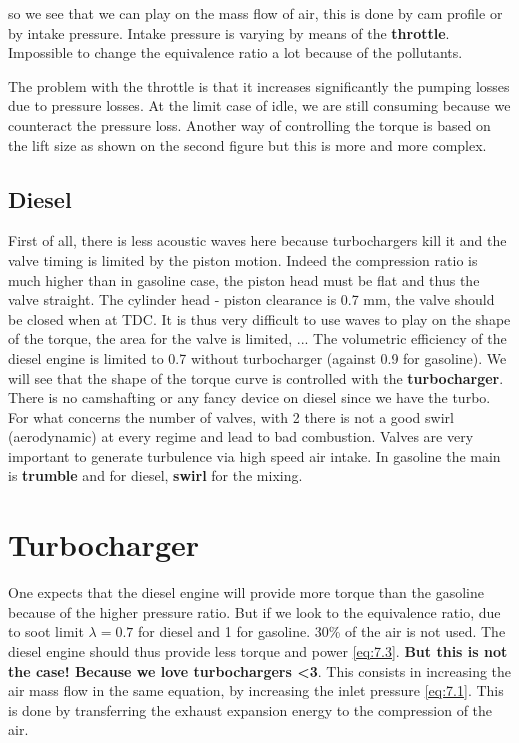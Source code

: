 	so we see that we can play on the mass flow of air, this is done by cam profile or by intake pressure. Intake pressure is varying by means of the \textbf{throttle}. Impossible to change the equivalence ratio a lot because of the pollutants. 
	
	The problem with the throttle is that it increases significantly the pumping losses due to pressure losses. At the limit case of idle, we are still consuming because we counteract the pressure loss. Another way of controlling the torque is based on the lift size as shown on the second figure but this is more and more complex. 
	
\subsection{Diesel}
	First of all, there is less acoustic waves here because turbochargers kill it and the valve timing is limited by the piston motion. Indeed the compression ratio is much higher than in gasoline case, the piston head must be flat and thus the valve straight. The cylinder head - piston clearance is 0.7 mm, the valve should be closed when at TDC. It is thus very difficult to use waves to play on the shape of the torque, the area for the valve is limited, ... The volumetric efficiency of the diesel engine is limited to 0.7 without turbocharger (against 0.9 for gasoline). We will see that the shape of the torque curve is controlled with the \textbf{turbocharger}. \\
	
	There is no camshafting or any fancy device on diesel since we have the turbo. For what concerns the number of valves, with 2 there is not a good swirl (aerodynamic) at every regime and lead to bad combustion. Valves are very important to generate turbulence via high speed air intake. In gasoline the main is \textbf{trumble} and for diesel, \textbf{swirl} for the mixing.   
	
\section{Turbocharger}
	
	One expects that the diesel engine will provide more torque than the gasoline because of the higher pressure ratio. But if we look to the equivalence ratio, due to soot limit $\lambda = 0.7$ for diesel and 1 for gasoline. 30\% of the air is not used. The diesel engine should thus provide less torque and power \eqref{eq:7.3}. \textbf{But this is not the case! Because we love turbochargers <3}. This consists in increasing the air mass flow in the same equation, by increasing the inlet pressure \eqref{eq:7.1}. This is done by transferring the exhaust expansion energy to the compression of the air. \\
	
